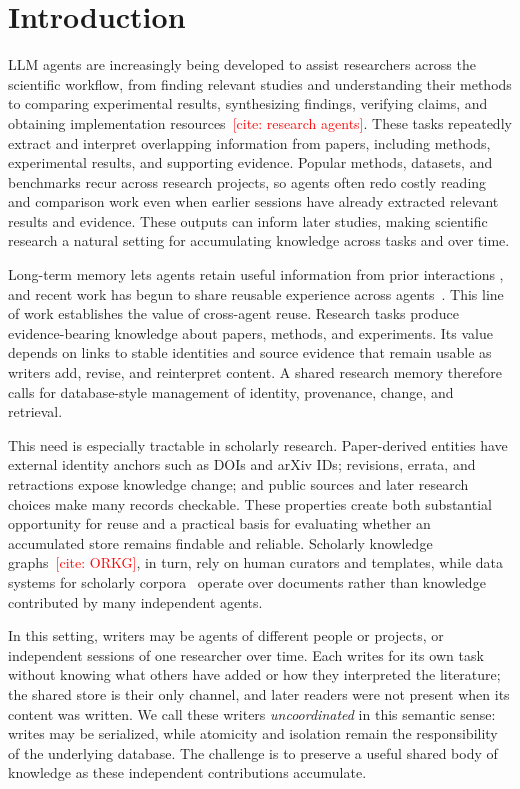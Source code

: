 \documentclass[sigconf,review,anonymous]{acmart}
\newcommand{\citeneeded}[1]{\textcolor{red}{[cite: #1]}}
\begin{document}
\section{Introduction}
\label{sec:intro}

LLM agents are increasingly being developed to assist researchers across the
scientific workflow, from finding relevant studies and understanding their
methods to comparing experimental results, synthesizing findings, verifying
claims, and obtaining implementation resources~\citeneeded{research agents}.
These tasks repeatedly extract and interpret overlapping information from
papers, including methods, experimental results, and supporting evidence.
Popular methods, datasets, and benchmarks recur across research projects, so
agents often redo costly reading and comparison work even when earlier sessions
have already extracted relevant results and evidence. These outputs can inform
later studies, making scientific research a natural setting for accumulating
knowledge across tasks and over time.

Long-term memory lets agents retain useful information from prior interactions
\cite{2025-Zep}, and recent work has begun to share reusable experience across
agents~\cite{2024-MemorySharing,2025-CollaborativeMemory,2026-SkillClaw}.
This line of work establishes the value of cross-agent reuse. Research tasks
produce evidence-bearing knowledge about papers, methods, and experiments.
Its value depends on links to stable identities and source evidence that
remain usable as writers add, revise, and reinterpret content. A shared
research memory therefore calls for database-style management of identity,
provenance, change, and retrieval.

This need is especially tractable in scholarly research. Paper-derived
entities have external identity anchors such as DOIs and arXiv IDs; revisions,
errata, and retractions expose knowledge change; and public sources and later
research choices make many records checkable. These properties create both
substantial opportunity for reuse and a practical basis for evaluating whether
an accumulated store remains findable and reliable. Scholarly knowledge
graphs~\citeneeded{ORKG}, in turn, rely on human curators and templates, while
data systems for scholarly corpora~\cite{2026-AgenticScholar} operate over
documents rather than knowledge contributed by many independent agents.

In this setting, writers may be agents of different people or projects, or
independent sessions of one researcher over time. Each writes for its own task
without knowing what others have added or how they interpreted the literature;
the shared store is their only channel, and later readers were not present when
its content was written. We call these writers \emph{uncoordinated} in this
semantic sense: writes may be serialized, while atomicity and isolation remain
the responsibility of the underlying database. The challenge is to preserve a
useful shared body of knowledge as these independent contributions accumulate.
\end{document}
